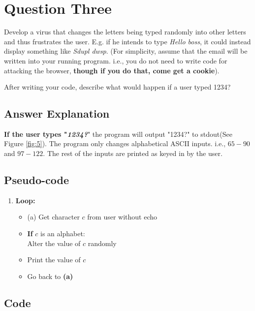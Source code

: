 \documentclass[]{article}
\begin{document}
\clearpage
\section{Question Three}

Develop a virus that changes the letters being typed randomly into other letters and thus frustrates the user. E.g. if he intends to type \emph{Hello boss}, it could instead display something like \emph{Sdupl dwsp}. (For simplicity, assume that the email will be written into your running program. i.e., you do not need to write code for attacking the browser, \textbf{ though if you do that, come get a cookie}).

After writing your code, describe what would happen if a user typed
1234?

\subsection{Answer Explanation}
\textbf{If the user types "\emph{1234?}}" the program will output "1234?" to stdout(See Figure \ref{fig:5}). The program only changes alphabetical ASCII inputs. i.e., $65 - 90 $ and $97 - 122$. The rest of the inputs are printed as keyed in by the user.

\subsection{Pseudo-code}
\begin{enumerate}
	\item \textbf{Loop:}
	\begin{itemize}
		\item (a) Get character $c$ from user without echo
		\item \textbf{If} $c$ is an alphabet: \\
		\hspace*{6em} Alter the value of $c$ randomly
		\item Print the value of $c$
		\item Go back to \textbf{(a)}
		
	\end{itemize}
\end{enumerate}


\subsection{Code} \label{sketch 3}


\clearpage
\end{document}

